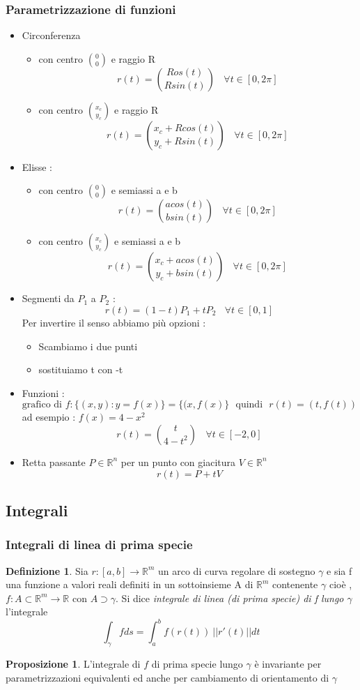 \documentclass{article}
\theoremstyle{definition}
\newtheorem*{definizione}{Definizione}
\newtheorem*{proposizione}{Proposizione}
\newcommand{\R}{\mathbb{R}}
\newcommand{\Rn}{\R^n}
\begin{document}
	\subsubsection{Parametrizzazione di funzioni}
	\begin{itemize}
		\item Circonferenza
		\begin{itemize}
			\item con centro $\binom{0}{0}$ e raggio R 
			$$r(t)=\binom{Ros(t)}{Rsin(t)}\ \ \ \ \forall t \in [0,2\pi]$$
			\item con centro $\binom{x_c}{y_c}$ e raggio R 
			$$r(t)=\binom{x_c+Rcos(t)}{y_c+Rsin(t)}\ \ \ \ \forall t \in [0,2\pi] $$
		\end{itemize}
		\item Elisse : 
		\begin{itemize}
			\item con centro $\binom{0}{0}$ e semiassi a e b
			$$r(t)=\binom{acos(t)}{bsin(t)}\ \ \ \ \forall t \in [0,2\pi]$$
			\item con centro $\binom{x_c}{y_c}$ e semiassi a e b
			$$r(t)=\binom{x_c+acos(t)}{y_c+bsin(t)}\ \ \ \ \forall t \in [0,2\pi]$$
		\end{itemize}
		\item  Segmenti da $P_1$ a  $P_2$ : 
		$$r(t)=(1-t)P_1+tP_2 \ \ \ \ \forall t \in [0,1]$$
		Per invertire il senso abbiamo più opzioni : 
		\begin{itemize}
			\item Scambiamo i due punti 
			\item sostituiamo t con -t 
		\end{itemize}
		\item Funzioni : 
		$$\text{grafico di }f : \{(x,y):y=f(x)\}=\{(x,f(x)\}  \ \ \ \text{quindi} \ \ \ r(t)=(t,f(t))$$
		ad esempio : $f(x)=4-x^2$ 
		$$r(t)=\binom{t}{4-t^2} \ \ \ \ \forall t \in [-2,0]$$
		\item Retta passante  $P\in \Rn$ per un punto con giacitura $V\in \Rn$
		$$r(t)=P+tV$$
	\end{itemize}
	\subsection{Integrali}
	\subsubsection{Integrali di linea di prima specie}
	\begin{definizione} 
		Sia $r:[a,b] \rightarrow\R^m $ un arco di curva regolare di sostegno $\gamma$ e sia f una funzione a valori reali definiti in un sottoinsieme A di $\R^m$ contenente $\gamma$ cioè , $f:A \subset \R^m \rightarrow \R$ con $A \supset \gamma$. Si dice \textit{integrale di linea (di prima specie) di f lungo $\gamma$} l'integrale 
		$$\int_{\gamma}fds=\int_a^b f(r(t))\ ||r'(t)|| dt$$
	\end{definizione}
	\begin{proposizione}
		L'integrale di $f$ di prima specie lungo $\gamma$ è invariante per parametrizzazioni equivalenti ed anche per cambiamento di orientamento di $\gamma$
	\end{proposizione}
	
\end{document}
